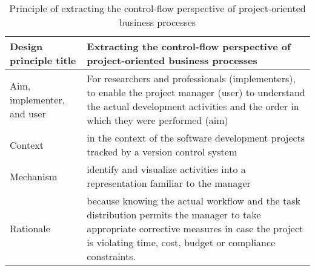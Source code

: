 \begin{table}[]
	\centering
	\caption{Principle of extracting the control-flow perspective of project-oriented business processes}
	\label{tab:control-flow-principle}
	\begin{tabular}{@{}lp{8cm}@{}}
		\toprule
		\textbf{Design principle title} &
		\textbf{Extracting the control-flow perspective of project-oriented business processes} \\ \midrule
		Aim, implementer, and user &
		For researchers and professionals (implementers), to enable the project manager (user) to understand the actual development activities and the order in which they were performed (aim) \\
		Context &
		in the context of the software development projects tracked by a version control system \\
		Mechanism &
		identify and visualize activities into a representation familiar to the manager \\
		Rationale &
		because knowing the actual workflow and the task distribution permits the manager to take appropriate corrective measures in case the project is violating time, cost, budget or compliance constraints. \\ \bottomrule
	\end{tabular}
\end{table}